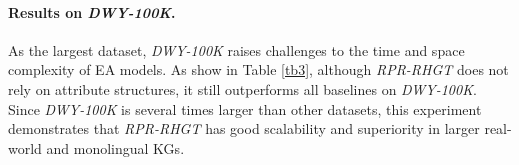 \documentclass{article}
\begin{document}
\begin{table}[h]
	\centering
	\caption{Overall performance of all models on \textit{DWY-100K}.
	All baseline performances are taken from their papers.}
	\label{tb3}
\end{table}


\paragraph{Results on \textit{DWY-100K}.}
As the largest dataset, \textit{DWY-100K} raises challenges to the time and space complexity of EA models.
As show in Table \ref{tb3}, although \textit{RPR-RHGT} does not rely on attribute structures, it still outperforms all baselines on \textit{DWY-100K}.
Since \textit{DWY-100K} is several times larger than other datasets, this experiment demonstrates that \textit{RPR-RHGT} has good scalability and superiority in larger real-world and monolingual KGs.
\end{document}
